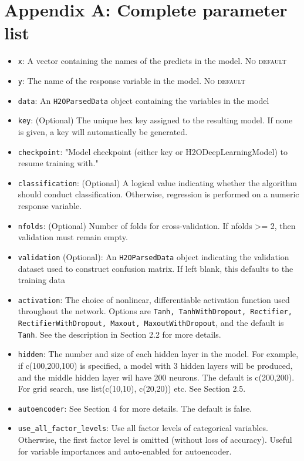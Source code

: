 \documentclass[12pt]{article}
\begin{document}
\newpage

\section{Appendix A: Complete parameter list}
\begin{itemize}
\item \texttt{x}: A vector containing the names of the predicts in the model. \textsc{No default}
\item \texttt{y}: The name of the response variable in the model. \textsc{No default}
\item \texttt{data}: An \texttt{H2OParsedData} object containing the variables in the model
\item \texttt{key}: (Optional) The unique hex key assigned to the resulting model. If none is given, a key will automatically be generated.
\item \texttt{checkpoint}: "Model checkpoint (either key or H2ODeepLearningModel) to resume training with."
\item \texttt{classification}: (Optional) A logical value indicating whether the algorithm should conduct classification. Otherwise, regression is performed on a numeric response variable.
\item \texttt{nfolds}: (Optional) Number of folds for cross-validation. If nfolds >= 2, then validation must remain empty.
\item \texttt{validation} (Optional): An \texttt{H2OParsedData} object indicating the validation dataset used to construct confusion matrix. If left blank, this defaults to the training data
\item \texttt{activation}: The choice of nonlinear, differentiable activation function used throughout the network. Options are \texttt{Tanh, TanhWithDropout, Rectifier, RectifierWithDropout, Maxout, MaxoutWithDropout}, and the default is \texttt{Tanh}. See the description in Section 2.2 for more details.
\item \texttt{hidden}: The number and size of each hidden layer in the model. For example, if c(100,200,100) is specified, a model with 3 hidden layers will be produced, and the middle hidden layer wil have 200 neurons. The default is c(200,200). For grid search, use list(c(10,10), c(20,20)) etc. See Section 2.5.
\item \texttt{autoencoder}: See Section 4 for more details. The default is false.
\item \texttt{use\_all\_factor\_levels}: Use all factor levels of categorical variables. Otherwise, the first factor level is omitted (without loss of accuracy). Useful for variable importances and auto-enabled for autoencoder.

\end{itemize}
\end{document}
